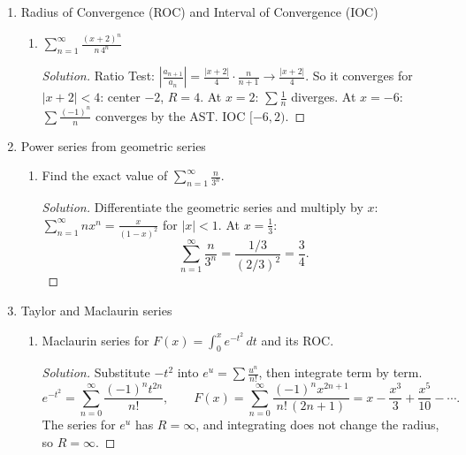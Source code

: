 \documentclass[12pt]{article}
\newenvironment{solution}
  {\renewcommand\qedsymbol{$\blacksquare$}\begin{proof}[Solution]}
  {\end{proof}}
\begin{document}
\begin{enumerate}
\begin{enumerate}
\end{enumerate}

\setcounter{enumi}{25}
\item Radius of Convergence (ROC) and Interval of Convergence (IOC)
\begin{enumerate}


\item[(c)] $\sum_{n=1}^\infty\frac{(x+2)^n}{n\,4^n}$
\begin{solution}
Ratio Test: $\left|\frac{a_{n+1}}{a_n}\right|=\frac{|x+2|}{4}\cdot\frac{n}{n+1}\to\frac{|x+2|}{4}$. So it converges for $|x+2|<4$: center $-2$, $R=4$. At $x=2$: $\sum\frac1n$ diverges. At $x=-6$: $\sum\frac{(-1)^n}{n}$ converges by the AST. IOC $[-6,2)$.
\end{solution}


\end{enumerate}

\setcounter{enumi}{26}
\item Power series from geometric series
\begin{enumerate}




\item[(e)] Find the exact value of $\sum_{n=1}^\infty\frac{n}{3^n}$.
\begin{solution}
Differentiate the geometric series and multiply by $x$: $\sum_{n=1}^\infty nx^n=\frac{x}{(1-x)^2}$ for $|x|<1$. At $x=\frac13$:
\[ \sum_{n=1}^\infty\frac{n}{3^n}=\frac{1/3}{(2/3)^2}=\frac34. \]
\end{solution}

\end{enumerate}

\setcounter{enumi}{27}
\item Taylor and Maclaurin series
\begin{enumerate}



\item[(d)] Maclaurin series for $F(x)=\int_0^xe^{-t^2}\,dt$ and its ROC.
\begin{solution}
Substitute $-t^2$ into $e^u=\sum\frac{u^n}{n!}$, then integrate term by term.
\[ e^{-t^2}=\sum_{n=0}^\infty\frac{(-1)^nt^{2n}}{n!}, \qquad F(x)=\sum_{n=0}^\infty\frac{(-1)^nx^{2n+1}}{n!\,(2n+1)}=x-\frac{x^3}{3}+\frac{x^5}{10}-\cdots. \]
The series for $e^u$ has $R=\infty$, and integrating does not change the radius, so $R=\infty$.
\end{solution}






\end{enumerate}
\end{enumerate}
\end{document}
